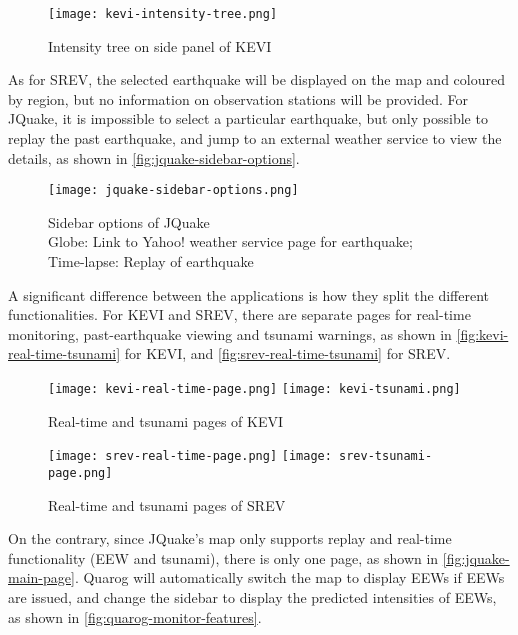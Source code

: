 \begin{figure}[htp]
    \centering

    \texttt{[image: kevi-intensity-tree.png]}
    \caption{Intensity tree on side panel of KEVI}
    \label{fig:kevi-intensity-tree}
\end{figure}

As for SREV, the selected earthquake will be displayed on the map and coloured by region, but no information on observation stations will be provided. For JQuake, it is impossible to select a particular earthquake, but only possible to replay the past earthquake, and jump to an external weather service to view the details, as shown in \autoref{fig:jquake-sidebar-options}.

\begin{figure}[htp]
    \centering

    \texttt{[image: jquake-sidebar-options.png]}
    \caption[Sidebar options of JQuake]{Sidebar options of JQuake\\
        Globe: Link to Yahoo! weather service page for earthquake;\\
        Time-lapse: Replay of earthquake}
    \label{fig:jquake-sidebar-options}
\end{figure}

A significant difference between the applications is how they split the different functionalities. For KEVI and SREV, there are separate pages for real-time monitoring, past-earthquake viewing and tsunami warnings, as shown in \autoref{fig:kevi-real-time-tsunami} for KEVI, and \autoref{fig:srev-real-time-tsunami} for SREV.

\begin{figure}[htp]
    \centering

    \texttt{[image: kevi-real-time-page.png]}
    \texttt{[image: kevi-tsunami.png]}
    \caption{Real-time and tsunami pages of KEVI}
    \label{fig:kevi-real-time-tsunami}
\end{figure}

\begin{figure}[htp]
    \centering

    \texttt{[image: srev-real-time-page.png]}
    \texttt{[image: srev-tsunami-page.png]}
    \caption{Real-time and tsunami pages of SREV}
    \label{fig:srev-real-time-tsunami}
\end{figure}

On the contrary, since JQuake's map only supports replay and real-time functionality (EEW and tsunami), there is only one page, as shown in \autoref{fig:jquake-main-page}. Quarog will automatically switch the map to display EEWs if EEWs are issued, and change the sidebar to display the predicted intensities of EEWs, as shown in \autoref{fig:quarog-monitor-features}.

